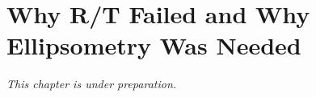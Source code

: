 
\chapter{Why R/T Failed and Why Ellipsometry Was Needed}
\label{ch:why_rt_failed}

\textit{This chapter is under preparation.}
